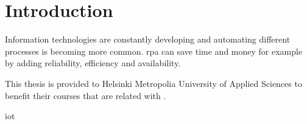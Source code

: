 
\chapter{Introduction}

Information technologies are constantly developing and automating different processes is becoming more common. \gls{rpa} can save time and money for example by adding reliability, efficiency and availability.

This thesis is provided to Helsinki Metropolia University of Applied Sciences to benefit their courses that are related with .

\gls{iot}


\clearpage %
